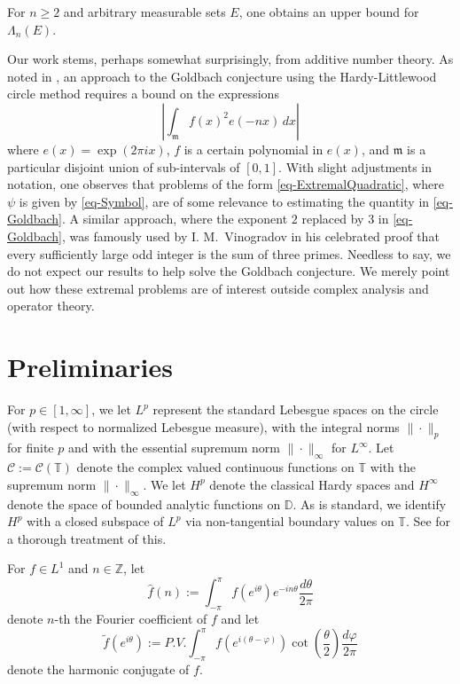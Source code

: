 \documentclass[11pt,reqno]{amsart}
\numberwithin{equation}{section}
\theoremstyle{plain}
\theoremstyle{definition}
\begin{document}
	For $n\ge 2$ and arbitrary measurable sets $E$, one obtains  an upper bound for $\Lambda_n(E)$.

	Our work stems, perhaps somewhat surprisingly, from additive number theory.
	As noted in \cite[p.~325]{MTB}, an approach to the Goldbach conjecture
	using the Hardy-Littlewood circle method requires a bound on the expressions
	\begin{equation}\label{eq-Goldbach}
		\left| \int_{\mathfrak{m}} f(x)^2 e(-nx)\,dx \right|
	\end{equation}
	where $e(x) = \exp(2\pi i x)$, $f$ is a certain polynomial in $e(x)$, and $\mathfrak{m}$
	is a particular disjoint union of sub-intervals of $[0,1]$.  With slight adjustments in notation, one
	observes that problems of the form \eqref{eq-ExtremalQuadratic}, where $\psi$ is given by \eqref{eq-Symbol},
	are of some relevance to estimating the quantity in \eqref{eq-Goldbach}.  A
	similar approach, where the exponent $2$ replaced by $3$ in \eqref{eq-Goldbach},
	was famously used by I. M.~Vinogradov in his celebrated proof 
	that every sufficiently large odd integer is the sum of three primes. 
Needless to say, we do not expect our results to help solve the Goldbach conjecture.  We merely point out how these 
	extremal problems are of interest outside  complex analysis and operator theory. 	
	
	
	
\section{Preliminaries}\label{Section:Preliminaries}
		
	
	For $p \in [1, \infty]$, we let $L^p$ represent the standard Lebesgue spaces on the circle (with respect to normalized Lebesgue measure), with the integral norms $\|\cdot\|_{p}$ for finite $p$ 
and with the essential supremum norm $\|\cdot\|_{\infty}$ for $L^{\infty}$. Let $\mathcal{C}:= \mathcal{C}(\mathbb{T})$ denote the complex valued continuous functions on ${\mathbb{T}}$ with the supremum norm $\|\cdot\|_{\infty}$. 	
	We let $H^p$ denote the classical Hardy spaces and $H^{\infty}$ denote the space of bounded analytic  functions on ${ \mathbb{D}}$. As is standard, we identify $H^p$ with a closed subspace of $L^p$ via non-tangential boundary values on ${\mathbb{T}}$. See \cite{Duren, Ga} for a thorough treatment of this. 
	
	For $f \in L^1$ and $n \in { \mathbb{Z}}$, let 
	$$\widehat{f}(n) := \int_{-\pi}^{\pi} f(e^{i \theta}) e^{-i n \theta} \frac{d \theta}{2 \pi}$$
	denote $n$-th the Fourier coefficient of $f$ and let
	\begin{equation} \label{HC}
	\widetilde{f}(e^{i \theta}) := P.V. \int_{-\pi}^{\pi} f(e^{i(\theta - \varphi)}) \cot\left(\frac{\theta}{2}\right) \frac{d \varphi}{2 \pi}
	\end{equation}
	denote the harmonic conjugate of $f$. 
\end{document}
